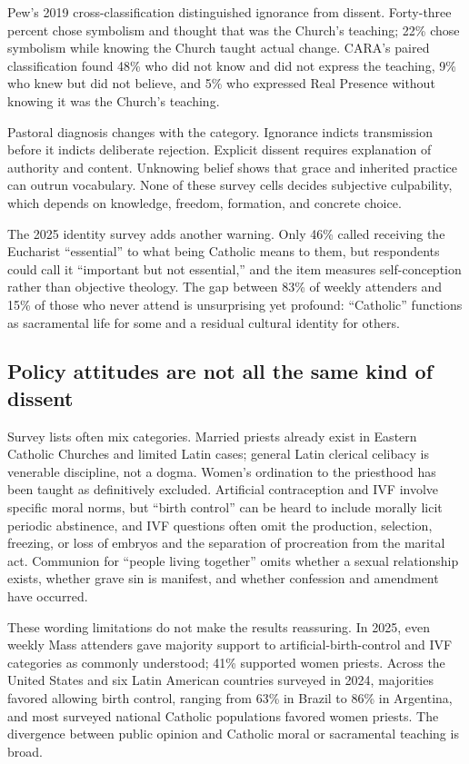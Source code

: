 Pew's 2019 cross-classification distinguished ignorance from dissent. Forty-three percent chose symbolism and thought that was the Church's teaching; 22\% chose symbolism while knowing the Church taught actual change. CARA's paired classification found 48\% who did not know and did not express the teaching, 9\% who knew but did not believe, and 5\% who expressed Real Presence without knowing it was the Church's teaching.

Pastoral diagnosis changes with the category. Ignorance indicts transmission before it indicts deliberate rejection. Explicit dissent requires explanation of authority and content. Unknowing belief shows that grace and inherited practice can outrun vocabulary. None of these survey cells decides subjective culpability, which depends on knowledge, freedom, formation, and concrete choice.

The 2025 identity survey adds another warning. Only 46\% called receiving the Eucharist “essential” to what being Catholic means to them, but respondents could call it “important but not essential,” and the item measures self-conception rather than objective theology. The gap between 83\% of weekly attenders and 15\% of those who never attend is unsurprising yet profound: “Catholic” functions as sacramental life for some and a residual cultural identity for others.

\subsection{Policy attitudes are not all the same kind of dissent}

Survey lists often mix categories. Married priests already exist in Eastern Catholic Churches and limited Latin cases; general Latin clerical celibacy is venerable discipline, not a dogma. Women's ordination to the priesthood has been taught as definitively excluded. Artificial contraception and IVF involve specific moral norms, but “birth control” can be heard to include morally licit periodic abstinence, and IVF questions often omit the production, selection, freezing, or loss of embryos and the separation of procreation from the marital act. Communion for “people living together” omits whether a sexual relationship exists, whether grave sin is manifest, and whether confession and amendment have occurred.

These wording limitations do not make the results reassuring. In 2025, even weekly Mass attenders gave majority support to artificial-birth-control and IVF categories as commonly understood; 41\% supported women priests. Across the United States and six Latin American countries surveyed in 2024, majorities favored allowing birth control, ranging from 63\% in Brazil to 86\% in Argentina, and most surveyed national Catholic populations favored women priests. The divergence between public opinion and Catholic moral or sacramental teaching is broad.

